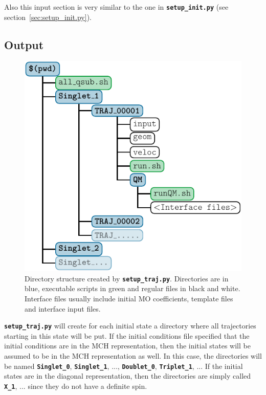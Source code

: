 \documentclass[a4paper,10pt,DIV=15,openany,twoside=false]{scrbook}
\newcommand{\ttt}[1]{\textbf{\texttt{#1}}}
\begin{document}
Also this input section is very similar to the one in \ttt{setup\_init.py} (see section~\ref{sec:setup_init.py}).

\subsection{Output}

\begin{figure}
  \centering
  \includegraphics[scale=1]{img/dirs_traj/dirs_traj.pdf}
  \caption{Directory structure created by \ttt{setup\_traj.py}. Directories are in blue, executable scripts in green and regular files in black and white. Interface files usually include initial MO coefficients, template files and interface input files.}
  \label{fig:dirs_traj}
\end{figure}

\ttt{setup\_traj.py} will create for each initial state a directory where all trajectories starting in this state will be put. If the initial conditions file specified that the initial conditions are in the MCH representation, then the initial states will be assumed to be in the MCH representation as well. In this case, the directories will be named \ttt{Singlet\_0}, \ttt{Singlet\_1}, ..., \ttt{Doublet\_0}, \ttt{Triplet\_1}, ... If the initial states are in the diagonal representation, then the directories are simply called \ttt{X\_1}, ... since they do not have a definite spin.
\end{document}
